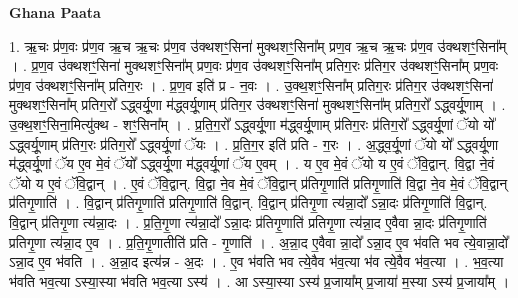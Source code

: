 \documentclass[17pt]{extarticle}
\begin{document}
\textbf{Ghana Paata } \newline

1. ऋ॒चः प्र॑ण॒वः प्र॑ण॒व ऋ॒च ऋ॒चः प्र॑ण॒व उ॑क्थशꣳ॒॒सिना॑ मुक्थशꣳ॒॒सिना᳚म् प्रण॒व ऋ॒च ऋ॒चः प्र॑ण॒व उ॑क्थशꣳ॒॒सिना᳚म् । . प्र॒ण॒व उ॑क्थशꣳ॒॒सिना॑ मुक्थशꣳ॒॒सिना᳚म् प्रण॒वः प्र॑ण॒व उ॑क्थशꣳ॒॒सिना᳚म् प्रतिग॒रः प्र॑तिग॒र उ॑क्थशꣳ॒॒सिना᳚म् प्रण॒वः प्र॑ण॒व उ॑क्थशꣳ॒॒सिना᳚म् प्रतिग॒रः । . प्र॒ण॒व इति॑ प्र - न॒वः । . उ॒क्थ॒शꣳ॒॒सिना᳚म् प्रतिग॒रः प्र॑तिग॒र उ॑क्थशꣳ॒॒सिना॑ मुक्थशꣳ॒॒सिना᳚म् प्रतिग॒रो᳚ ऽद्ध्वर्यू॒णा म॑द्ध्वर्यू॒णाम् प्र॑तिग॒र उ॑क्थशꣳ॒॒सिना॑ मुक्थशꣳ॒॒सिना᳚म् प्रतिग॒रो᳚ ऽद्ध्वर्यू॒णाम् । . उ॒क्थ॒शꣳ॒॒सिना॒मित्यु॑क्थ - शꣳ॒॒सिना᳚म् । . प्र॒ति॒ग॒रो᳚ ऽद्ध्वर्यू॒णा म॑द्ध्वर्यू॒णाम् प्र॑तिग॒रः प्र॑तिग॒रो᳚ ऽद्ध्वर्यू॒णां ॅयो यो᳚ ऽद्ध्वर्यू॒णाम् प्र॑तिग॒रः प्र॑तिग॒रो᳚ ऽद्ध्वर्यू॒णां ॅयः । . प्र॒ति॒ग॒र इति॑ प्रति - ग॒रः । . अ॒द्ध्व॒र्यू॒णां ॅयो यो᳚ ऽद्ध्वर्यू॒णा म॑द्ध्वर्यू॒णां ॅय ए॒व मे॒वं ॅयो᳚ ऽद्ध्वर्यू॒णा म॑द्ध्वर्यू॒णां ॅय ए॒वम् । . य ए॒व मे॒वं ॅयो य ए॒वं ॅवि॒द्वान्. वि॒द्वा ने॒वं ॅयो य ए॒वं ॅवि॒द्वान् । . ए॒वं ॅवि॒द्वान्. वि॒द्वा ने॒व मे॒वं ॅवि॒द्वान् प्र॑तिगृ॒णाति॑ प्रतिगृ॒णाति॑ वि॒द्वा ने॒व मे॒वं ॅवि॒द्वान् प्र॑तिगृ॒णाति॑ । . वि॒द्वान् प्र॑तिगृ॒णाति॑ प्रतिगृ॒णाति॑ वि॒द्वान्. वि॒द्वान् प्र॑तिगृ॒णा त्य॑न्ना॒दो᳚ ऽन्ना॒दः प्र॑तिगृ॒णाति॑ वि॒द्वान्. वि॒द्वान् प्र॑तिगृ॒णा त्य॑न्ना॒दः । . प्र॒ति॒गृ॒णा त्य॑न्ना॒दो᳚ ऽन्ना॒दः प्र॑तिगृ॒णाति॑ प्रतिगृ॒णा त्य॑न्ना॒द ए॒वैवा न्ना॒दः प्र॑तिगृ॒णाति॑ प्रतिगृ॒णा त्य॑न्ना॒द ए॒व । . प्र॒ति॒गृ॒णातीति॑ प्रति - गृ॒णाति॑ । . अ॒न्ना॒द ए॒वैवा न्ना॒दो᳚ ऽन्ना॒द ए॒व भ॑वति भव त्ये॒वान्ना॒दो᳚ ऽन्ना॒द ए॒व भ॑वति । . अ॒न्ना॒द इत्य॑न्न - अ॒दः । . ए॒व भ॑वति भव त्ये॒वैव भ॑व॒त्या भ॑व त्ये॒वैव भ॑व॒त्या । . भ॒व॒त्या भ॑वति भव॒त्या ऽस्या॒स्या भ॑वति भव॒त्या ऽस्य॑ । . आ ऽस्या॒स्या ऽस्य॑ प्र॒जाया᳚म् प्र॒जाया॑ म॒स्या ऽस्य॑ प्र॒जाया᳚म् । \newline
\end{document}
